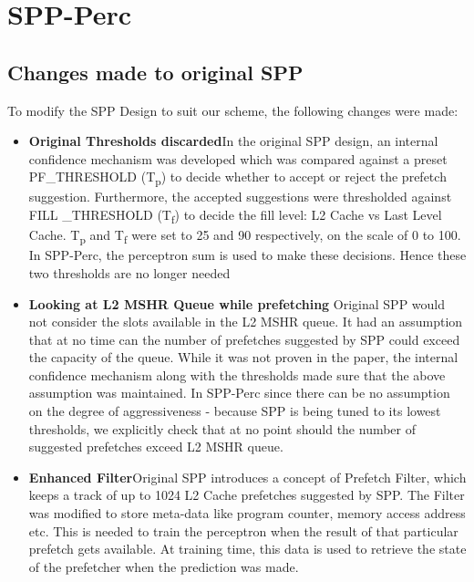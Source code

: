 \section{SPP-Perc}

\subsection{Changes made to original SPP}
To modify the SPP Design to suit our scheme, the following changes were made:

\begin{itemize}
\item \textbf{Original Thresholds discarded}\newline In the original
  SPP design, an internal confidence mechanism was developed which was
  compared against a preset PF\_THRESHOLD (T\textsubscript{p}) to
  decide whether to accept or reject the prefetch suggestion.
  Furthermore, the accepted suggestions were thresholded against FILL
  \_THRESHOLD (T\textsubscript{f}) to decide the fill level: L2 Cache
  vs Last Level Cache.  T\textsubscript{p} and T\textsubscript{f} were
  set to 25 and 90 respectively, on the scale of 0 to 100.  In
  SPP-Perc, the perceptron sum is used to make these decisions.  Hence
  these two thresholds are no longer needed

\item \textbf{Looking at L2 MSHR Queue while prefetching}\newline
  Original SPP would not consider the slots available in the L2 MSHR
  queue.  It had an assumption that at no time can the number of
  prefetches suggested by SPP could exceed the capacity of the queue.
  While it was not proven in the paper, the internal confidence
  mechanism along with the thresholds made sure that the above
  assumption was maintained.  In SPP-Perc since there can be no
  assumption on the degree of aggressiveness - because SPP is being
  tuned to its lowest thresholds, we explicitly check that at no point
  should the number of suggested prefetches exceed L2 MSHR queue.

\item \textbf{Enhanced Filter}\newline Original SPP introduces a
  concept of Prefetch Filter, which keeps a track of up to 1024 L2
  Cache prefetches suggested by SPP.  The Filter was modified to store
  meta-data like program counter, memory access address etc.  This is
  needed to train the perceptron when the result of that particular
  prefetch gets available.  At training time, this data is used to
  retrieve the state of the prefetcher when the prediction was made.


\end{itemize}
